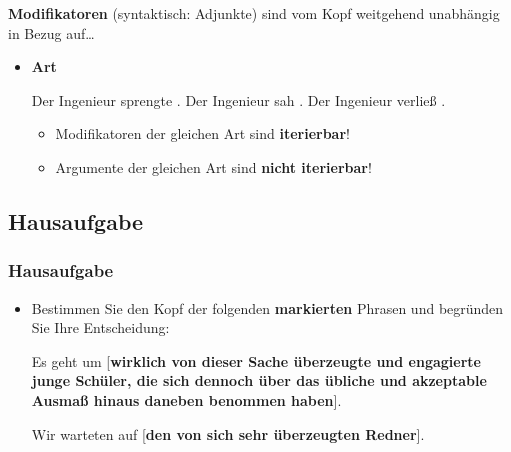 \begin{frame}

\textbf{Modifikatoren} (syntaktisch: Adjunkte) sind vom Kopf weitgehend unabhängig in Bezug auf\dots

\begin{itemize}
	\item \textbf{Art}

\eal 
\ex Der Ingenieur sprengte . 
\ex Der Ingenieur sah . 
\ex Der Ingenieur verließ .
\zl

	\begin{itemize}
		\item Modifikatoren der gleichen Art sind \textbf{iterierbar}!
		\item Argumente der gleichen Art sind \textbf{nicht iterierbar}!
		
		\eal 
		\zl

		
	\end{itemize}

\end{itemize}

\end{frame}


\subsection{Hausaufgabe}



	
\begin{frame}
\frametitle{Hausaufgabe}

\begin{itemize}

	\item Bestimmen Sie den Kopf der folgenden \textbf{markierten} Phrasen und begründen Sie Ihre Entscheidung:
	
	\ea\label{ex:KopfSchueler} Es geht um [\textbf{wirklich von dieser Sache überzeugte und engagierte junge Schüler, die sich dennoch über das übliche und akzeptable Ausmaß hinaus daneben benommen haben}].
	\z
	
	\ea Wir warteten auf [\textbf{den von sich sehr überzeugten Redner}].
	\z 
	
\end{itemize}

\end{frame}

